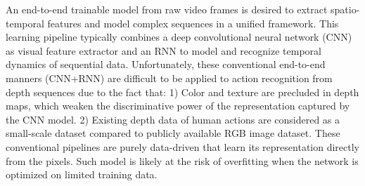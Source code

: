 \documentclass[10pt,twocolumn,letterpaper]{article}
\begin{document}
An end-to-end trainable model from raw video frames \cite{lrcn2014} is desired to extract spatio-temporal features and model complex sequences in a unified framework. This learning pipeline typically combines a deep convolutional neural network (CNN) \cite{Alex_nips_2012} as visual feature extractor and an RNN \cite{Graves_2012_book} to model and recognize temporal dynamics of sequential data. Unfortunately, these conventional end-to-end manners (CNN+RNN) are difficult to be applied to action recognition from depth sequences due to the fact that: 1) Color and texture are precluded in depth maps, which weaken the discriminative power of the representation captured by the CNN model. 2) Existing depth data of human actions are considered as a small-scale dataset compared to publicly available RGB image dataset. These conventional pipelines are purely data-driven that learn its representation directly from the pixels. Such model is likely at the risk of overfitting when the network is optimized on limited training data. 
\end{document}

